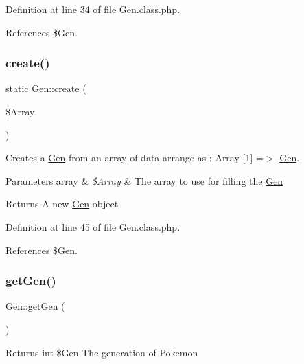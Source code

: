 Definition at line 34 of file Gen.\+class.\+php.



References \$\+Gen.

\mbox{\label{class_gen_a2eff54119786637464f82e40ac285e1b}} 
\subsubsection{\texorpdfstring{create()}{create()}}
{\footnotesize\ttfamily static Gen\+::create (\begin{DoxyParamCaption}\item[{}]{\$\+Array }\end{DoxyParamCaption})\hspace{0.3cm}{\ttfamily [static]}}



Creates a \hyperlink{class_gen}{Gen} from an array of data arrange as \+: Array \mbox{[}1\mbox{]} =$>$ \hyperlink{class_gen}{Gen}. 


\begin{DoxyParams}[1]{Parameters}
array & {\em \$\+Array} & The array to use for filling the \hyperlink{class_gen}{Gen} \\
\hline
\end{DoxyParams}
\begin{DoxyReturn}{Returns}
A new \hyperlink{class_gen}{Gen} object 
\end{DoxyReturn}


Definition at line 45 of file Gen.\+class.\+php.



References \$\+Gen.

\mbox{\label{class_gen_a73226bea244413aaded0a1f39fc2c168}} 
\subsubsection{\texorpdfstring{get\+Gen()}{getGen()}}
{\footnotesize\ttfamily Gen\+::get\+Gen (\begin{DoxyParamCaption}{ }\end{DoxyParamCaption})}

\begin{DoxyReturn}{Returns}
int \$\+Gen The generation of Pokemon 
\end{DoxyReturn}


